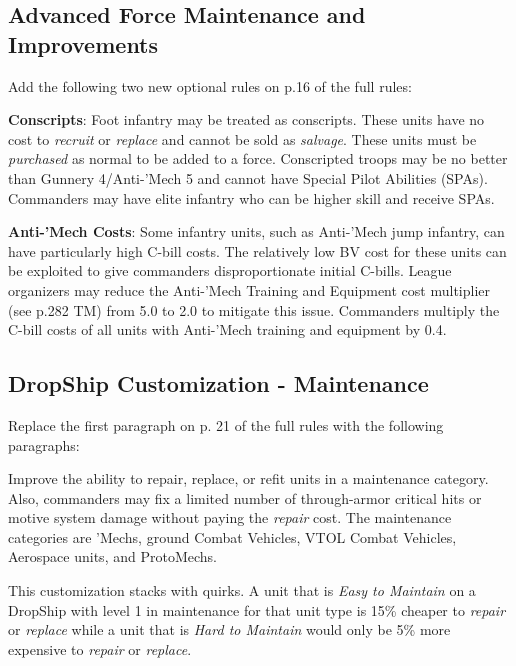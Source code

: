 \subsection{Advanced Force Maintenance and Improvements}

Add the following two new optional rules on p.16 of the full rules:

\begin{description}

\item {\bfseries Conscripts}: Foot infantry may be treated as conscripts.
These units have no cost to \emph{recruit} or \emph{replace} and cannot be sold as \emph{salvage}.
These units must be \emph{purchased} as normal to be added to a force.
Conscripted troops may be no better than Gunnery 4/Anti-'Mech 5 and cannot have Special Pilot Abilities (SPAs).
Commanders may have elite infantry who can be higher skill and receive SPAs.

\item {\bfseries Anti-'Mech Costs}: Some infantry units, such as Anti-'Mech jump infantry, can have particularly high C-bill costs.
The relatively low BV cost for these units can be exploited to give commanders disproportionate initial C-bills.
League organizers may reduce the Anti-'Mech Training and Equipment cost multiplier (see p.282 TM) from 5.0 to 2.0 to mitigate this issue.
Commanders multiply the C-bill costs of all units with Anti-'Mech training and equipment by 0.4.

\end{description}

\subsection{DropShip Customization - Maintenance}

Replace the first paragraph on p. 21 of the full rules with the following paragraphs:

Improve the ability to repair, replace, or refit units in a maintenance category.
Also, commanders may fix a limited number of through-armor critical hits or motive system damage without paying the \emph{repair} cost.
The maintenance categories are 'Mechs, ground Combat Vehicles, VTOL Combat Vehicles, Aerospace units, and ProtoMechs.

This customization stacks with quirks.
A unit that is \emph{Easy to Maintain} on a DropShip with level 1 in maintenance for that unit type is 15\% cheaper to \emph{repair} or \emph{replace} while a unit that is \emph{Hard to Maintain} would only be 5\% more expensive to \emph{repair} or \emph{replace}.

